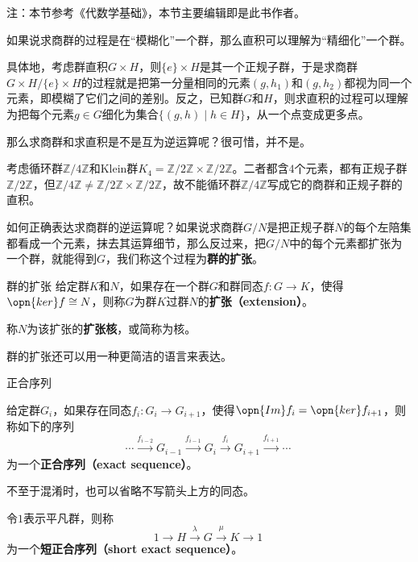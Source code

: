 


注：本节参考《代数学基础》，本节主要编辑即是此书作者。

如果说求商群的过程是在“模糊化”一个群，那么直积可以理解为“精细化”一个群。

具体地，考虑群直积$G\times H$，则$\{e\}\times H$是其一个正规子群，于是求商群$G\times H/\{e\}\times H$的过程就是把第一分量相同的元素$(g, h_1)$和$(g, h_2)$都视为同一个元素，即模糊了它们之间的差别。反之，已知群$G$和$H$，则求直积的过程可以理解为把每个元素$g\in G$细化为集合$\{(g, h)\mid h\in H\}$，从一个点变成更多点。


那么求商群和求直积是不是互为逆运算呢？很可惜，并不是。



\begin{example}{}\label{ex_GrpExt_1}
考虑循环群$\mathbb{Z}/4\mathbb{Z}$和Klein群$K_4=\mathbb{Z}/2\mathbb{Z}\times \mathbb{Z}/2\mathbb{Z}$。二者都含$4$个元素，都有正规子群$\mathbb{Z}/2\mathbb{Z}$，但$\mathbb{Z}/4\mathbb{Z}\neq \mathbb{Z}/2\mathbb{Z}\times \mathbb{Z}/2\mathbb{Z}$，故不能循环群$\mathbb{Z}/4\mathbb{Z}$写成它的商群和正规子群的直积。
\end{example}




如何正确表达求商群的逆运算呢？如果说求商群$G/N$是把正规子群$N$的每个左陪集都看成一个元素，抹去其运算细节，那么反过来，把$G/N$中的每个元素都扩张为一个群，就能得到$G$，我们称这个过程为\textbf{群的扩张}。



\begin{definition}{群的扩张}\label{def_GrpExt_1}
给定群$K$和$N$，如果存在一个群$G$和群同态$f:G\to K$，使得$\opn{ker}f\cong N$，则称$G$为群$K$过群$N$的\textbf{扩张（extension）}。

称$N$为该扩张的\textbf{扩张核}，或简称为核。
\end{definition}




群的扩张还可以用一种更简洁的语言来表达。



\begin{definition}{正合序列}

给定群$G_i$，如果存在同态$f_i:G_i\to G_{i+1}$，使得$\opn{Im}f_i=\opn{ker}f_{i+1}$，则称如下的序列
\begin{equation}
    \cdots \xrightarrow{f_{i-2}} G_{i-1} \xrightarrow{f_{i-1}} G_i \xrightarrow{f_i} G_{i+1} \xrightarrow{f_{i+1}}\cdots~
\end{equation}
为一个\textbf{正合序列（exact sequence）}。

不至于混淆时，也可以省略不写箭头上方的同态。

令$1$表示平凡群，则称
\begin{equation}
    1\xrightarrow{}H\xrightarrow{\lambda}G\xrightarrow{\mu}K\xrightarrow{}1~
\end{equation}
为一个\textbf{短正合序列（short exact sequence）}。

\end{definition}


